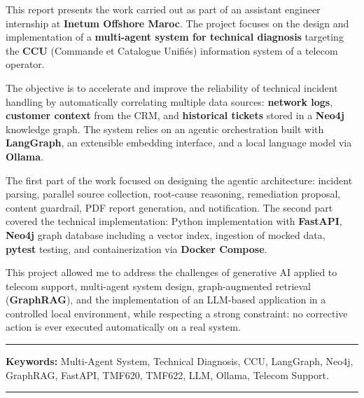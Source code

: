\resumeAn
%
This report presents the work carried out as part of an assistant engineer internship at \textbf{Inetum Offshore Maroc}. The project focuses on the design and implementation of a \textbf{multi-agent system for technical diagnosis} targeting the \textbf{CCU} (Commande et Catalogue Unifiés) information system of a telecom operator.

\medskip

The objective is to accelerate and improve the reliability of technical incident handling by automatically correlating multiple data sources: \textbf{network logs}, \textbf{customer context} from the CRM, and \textbf{historical tickets} stored in a \textbf{Neo4j} knowledge graph. The system relies on an agentic orchestration built with \textbf{LangGraph}, an extensible embedding interface, and a local language model via \textbf{Ollama}.

\medskip

The first part of the work focused on designing the agentic architecture: incident parsing, parallel source collection, root-cause reasoning, remediation proposal, content guardrail, PDF report generation, and notification. The second part covered the technical implementation: Python implementation with \textbf{FastAPI}, \textbf{Neo4j} graph database including a vector index, ingestion of mocked data, \textbf{pytest} testing, and containerization via \textbf{Docker Compose}.

\medskip

This project allowed me to address the challenges of generative AI applied to telecom support, multi-agent system design, graph-augmented retrieval (\textbf{GraphRAG}), and the implementation of an LLM-based application in a controlled local environment, while respecting a strong constraint: no corrective action is ever executed automatically on a real system.


\vspace{1cm}


\noindent\rule[2pt]{\textwidth}{0.5pt}

{\textbf{Keywords:}}
Multi-Agent System, Technical Diagnosis, CCU, LangGraph, Neo4j, GraphRAG, FastAPI, TMF620, TMF622, LLM, Ollama, Telecom Support.
\\
\noindent\rule[2pt]{\textwidth}{0.5pt}
